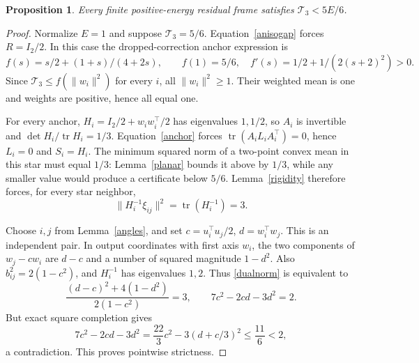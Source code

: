 \documentclass[10pt]{article}
\newtheorem{proposition}[theorem]{Proposition}
\newcommand{\tr}{\operatorname{tr}}
\newcommand{\T}{\mathcal T_3}
\begin{document}
\begin{proposition}\label{strictfinite}
Every finite positive-energy residual frame satisfies $\T<5E/6$.
\end{proposition}
\begin{proof}
Normalize $E=1$ and suppose $\T=5/6$. Equation~\eqref{anisogap} forces
$R=I_2/2$. In this case the dropped-correction anchor expression is
\[
 f(s)=s/2+(1+s)/(4+2s),\qquad f(1)=5/6,\quad
 f'(s)=1/2+1/(2(s+2)^2)>0.
\]
Since $\T\le f(\|w_i\|^2)$ for every $i$, all $\|w_i\|^2\ge1$.
Their weighted mean is one and weights are positive, hence all equal one.

For every anchor, $H_i=I_2/2+w_iw_i^\top/2$ has eigenvalues $1,1/2$,
so $A_i$ is invertible and $\det H_i/\tr H_i=1/3$.
Equation~\eqref{anchor} forces $\tr(A_iL_iA_i^\top)=0$, hence $L_i=0$
and $S_i=H_i$. The minimum squared norm of a two-point convex mean in this
star must equal $1/3$: Lemma~\ref{planar} bounds it above by $1/3$,
while any smaller value would produce a certificate below $5/6$.
Lemma~\ref{rigidity} therefore forces, for every star neighbor,
\begin{equation}\label{dualnorm}
 \|H_i^{-1}\xi_{ij}\|^2=\tr(H_i^{-1})=3.
\end{equation}

Choose $i,j$ from Lemma~\ref{angles}, and set
$c=u_i^\top u_j/2$, $d=w_i^\top w_j$. This is an independent pair.
In output coordinates with first axis $w_i$, the two components of
$w_j-cw_i$ are $d-c$ and a number of squared magnitude $1-d^2$.
Also $b_{ij}^2=2(1-c^2)$, and $H_i^{-1}$ has eigenvalues $1,2$.
Thus \eqref{dualnorm} is equivalent to
\[
 \frac{(d-c)^2+4(1-d^2)}{2(1-c^2)}=3,\qquad
 7c^2-2cd-3d^2=2.
\]
But exact square completion gives
\[
 7c^2-2cd-3d^2=\frac{22}{3}c^2-3(d+c/3)^2
 \le\frac{11}{6}<2,
\]
a contradiction. This proves pointwise strictness.
\end{proof}
\end{document}
